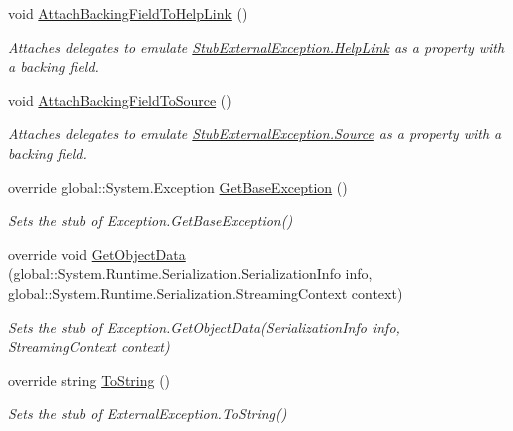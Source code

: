 \begin{DoxyCompactItemize}
void \hyperlink{class_system_1_1_runtime_1_1_interop_services_1_1_fakes_1_1_stub_external_exception_a1d493230e698bf8c239c667e52f8e16c}{Attach\-Backing\-Field\-To\-Help\-Link} ()
\begin{DoxyCompactList}\small\item\em Attaches delegates to emulate \hyperlink{class_system_1_1_runtime_1_1_interop_services_1_1_fakes_1_1_stub_external_exception_aae6e74b925e77a26ba73c332708acd44}{Stub\-External\-Exception.\-Help\-Link} as a property with a backing field.\end{DoxyCompactList}\item 
void \hyperlink{class_system_1_1_runtime_1_1_interop_services_1_1_fakes_1_1_stub_external_exception_a4ac0bf2f6250c4db39a932f3caca04df}{Attach\-Backing\-Field\-To\-Source} ()
\begin{DoxyCompactList}\small\item\em Attaches delegates to emulate \hyperlink{class_system_1_1_runtime_1_1_interop_services_1_1_fakes_1_1_stub_external_exception_ac759ceb8de292faca7a54a7f5adc395d}{Stub\-External\-Exception.\-Source} as a property with a backing field.\end{DoxyCompactList}\item 
override global\-::\-System.\-Exception \hyperlink{class_system_1_1_runtime_1_1_interop_services_1_1_fakes_1_1_stub_external_exception_a980376ac60242aead5681a7778e7869c}{Get\-Base\-Exception} ()
\begin{DoxyCompactList}\small\item\em Sets the stub of Exception.\-Get\-Base\-Exception()\end{DoxyCompactList}\item 
override void \hyperlink{class_system_1_1_runtime_1_1_interop_services_1_1_fakes_1_1_stub_external_exception_a68f143b308ec5c20054bb12b1b21c677}{Get\-Object\-Data} (global\-::\-System.\-Runtime.\-Serialization.\-Serialization\-Info info, global\-::\-System.\-Runtime.\-Serialization.\-Streaming\-Context context)
\begin{DoxyCompactList}\small\item\em Sets the stub of Exception.\-Get\-Object\-Data(\-Serialization\-Info info, Streaming\-Context context)\end{DoxyCompactList}\item 
override string \hyperlink{class_system_1_1_runtime_1_1_interop_services_1_1_fakes_1_1_stub_external_exception_a1b40910152dd785cb297c7fbdd7c383c}{To\-String} ()
\begin{DoxyCompactList}\small\item\em Sets the stub of External\-Exception.\-To\-String()\end{DoxyCompactList}\end{DoxyCompactItemize}
